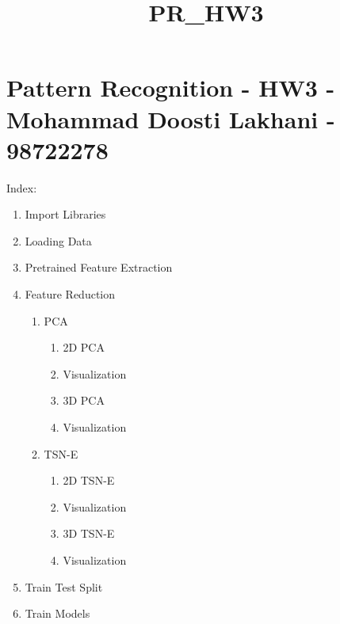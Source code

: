 \documentclass[11pt]{article}
\title{PR\_HW3}
\providecommand{\tightlist}{%
      \setlength{\itemsep}{0pt}\setlength{\parskip}{0pt}}
\begin{document}
    
    
    \maketitle
    
    

    
    \hypertarget{pattern-recognition---hw3---mohammad-doosti-lakhani---98722278}{%
\section{Pattern Recognition - HW3 - Mohammad Doosti Lakhani -
98722278}\label{pattern-recognition---hw3---mohammad-doosti-lakhani---98722278}}

Index:

\begin{enumerate}
\def\labelenumi{\arabic{enumi}.}
\tightlist
\item
  Import Libraries
\item
  Loading Data
\item
  Pretrained Feature Extraction
\item
  Feature Reduction

  \begin{enumerate}
  \def\labelenumii{\arabic{enumii}.}
  \tightlist
  \item
    PCA

    \begin{enumerate}
    \def\labelenumiii{\arabic{enumiii}.}
    \tightlist
    \item
      2D PCA
    \item
      Visualization
    \item
      3D PCA
    \item
      Visualization
    \end{enumerate}
  \item
    TSN-E

    \begin{enumerate}
    \def\labelenumiii{\arabic{enumiii}.}
    \tightlist
    \item
      2D TSN-E
    \item
      Visualization
    \item
      3D TSN-E
    \item
      Visualization
    \end{enumerate}
  \end{enumerate}
\item
  Train Test Split
\item
  Train Models


\end{enumerate}
\end{document}
